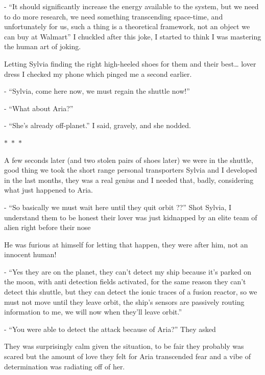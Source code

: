 \documentclass[colorlinks,12pt,a4paper]{book}
\newcommand\sep{\begin{center}
  \boldmath $\ast$~$\ast$~$\ast$
\end{center}}
\begin{document}
 - “It should significantly increase the energy available to the system, but we need to do more research, we need something 
 transcending space-time, and unfortunately for us, such a thing is a theoretical framework, not an object we can buy
  at Walmart” I chuckled after this joke, I started to think I was mastering the human art of joking.\par
  \bigskip
 
 Letting Sylvia finding the right high-heeled shoes for them and their best… lover dress I checked my phone which pinged 
 me a second earlier.\par
 \bigskip
 
 - “Sylvia, come here now, we must regain the shuttle now!”\par
 \bigskip
 - “What about Aria?”\par
 \bigskip
 - “She's already off-planet.” I said, gravely, and she nodded.
 
 \sep
 
 A few seconds later (and two stolen pairs of shoes later) we were in the shuttle, good thing we took the short range
  personal transporters Sylvia and I developed in the last months, they was a real genius and I needed that, badly, 
  considering what just happened to Aria.\par
  \bigskip
 
 - “So basically we must wait here until they quit orbit ??” Shot Sylvia, I understand them to be honest their lover was 
 just kidnapped by an elite team of alien right before their nose\par
 \bigskip
 
 He was furious at himself for letting that happen, they were after him, not an innocent human!\par
 \bigskip
 
 - “Yes they are on the planet, they can't detect my ship because it's parked on the moon, with anti detection fields 
 activated, for the same reason they can't detect this shuttle, but they can detect the ionic traces of a fusion reactor,
 so we must not move until they leave orbit, the ship's sensors are passively routing information to me, we will now when 
 they'll leave orbit.”\par
 \bigskip
 
 - “You were able to detect the attack because of Aria?” They asked\par
 \bigskip
 
 They was surprisingly calm given the situation, to be fair they probably was scared but the amount of love they felt for
  Aria transcended fear and a vibe of determination was radiating off of her.\par
  \bigskip
 
\end{document}
